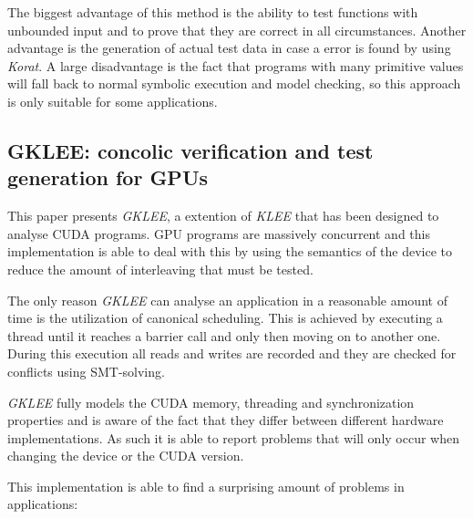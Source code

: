 \documentclass[10pt]{llncs}
\begin{document}
The biggest advantage of this method is the ability to test functions with unbounded input and to prove that they are correct in all circumstances. Another advantage is the generation of actual test data in case a error is found by using \emph{Korat}. A large disadvantage is the fact that programs with many primitive values will fall back to normal symbolic execution and model checking, so this approach is only suitable for some applications.

\subsection{GKLEE: concolic verification and test generation for GPUs \cite{base7}}

This paper presents \emph{GKLEE}, a extention of \emph{KLEE} \cite{klee} that has been designed to analyse CUDA programs. GPU programs are massively concurrent and this implementation is able to deal with this by using the semantics of the device to reduce the amount of interleaving that must be tested.

The only reason \emph{GKLEE} can analyse an application in a reasonable amount of time is the utilization of canonical scheduling. This is achieved by executing a thread until it reaches a barrier call and only then moving on to another one. During this execution all reads and writes are recorded and they are checked for conflicts using SMT-solving.

\emph{GKLEE} fully models the CUDA memory, threading and synchronization properties and is aware of the fact that they differ between different hardware implementations. As such it is able to report problems that will only occur when changing the device or the CUDA version.

This implementation is able to find a surprising amount of problems in applications:
\end{document}
